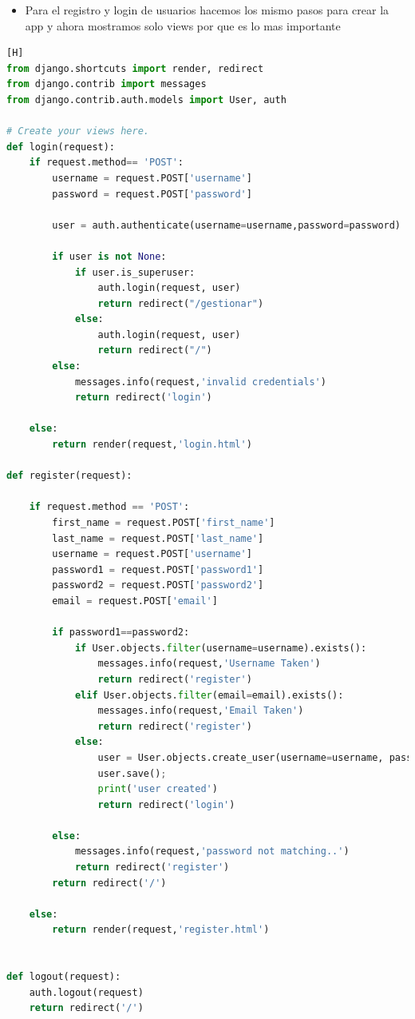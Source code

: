 \documentclass{article}
\begin{document}
	\begin{itemize}
		\item Para el registro y login de usuarios hacemos los mismo pasos para crear la app y ahora mostramos solo views por que es lo mas importante
	\end{itemize}	
	\begin{lstlisting}[language=Python,caption={Codigo de views.py de accounts}][H]
from django.shortcuts import render, redirect
from django.contrib import messages
from django.contrib.auth.models import User, auth

# Create your views here.
def login(request):
    if request.method== 'POST':
        username = request.POST['username']
        password = request.POST['password']

        user = auth.authenticate(username=username,password=password)

        if user is not None:
            if user.is_superuser:
                auth.login(request, user)
                return redirect("/gestionar")   
            else:
                auth.login(request, user)
                return redirect("/")
        else:
            messages.info(request,'invalid credentials')
            return redirect('login')

    else:
        return render(request,'login.html')    

def register(request):

    if request.method == 'POST':
        first_name = request.POST['first_name']
        last_name = request.POST['last_name']
        username = request.POST['username']
        password1 = request.POST['password1']
        password2 = request.POST['password2']
        email = request.POST['email']

        if password1==password2:
            if User.objects.filter(username=username).exists():
                messages.info(request,'Username Taken')
                return redirect('register')
            elif User.objects.filter(email=email).exists():
                messages.info(request,'Email Taken')
                return redirect('register')
            else:   
                user = User.objects.create_user(username=username, password=password1, email=email,first_name=first_name,last_name=last_name)
                user.save();
                print('user created')
                return redirect('login')

        else:
            messages.info(request,'password not matching..')    
            return redirect('register')
        return redirect('/')
        
    else:
        return render(request,'register.html')


def logout(request):
    auth.logout(request)
    return redirect('/')       
	\end{lstlisting}
	
\end{document}
